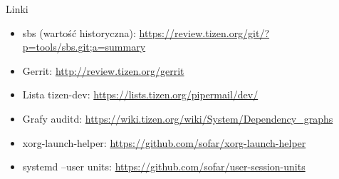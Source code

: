 \documentclass[presentation,aspectratio=43,12pt]{beamer}
\begin{document}
\begin{frame}[label=sec-7-3]{Linki}
\begin{itemize}
\item sbs (wartość historyczna): \url{https://review.tizen.org/git/?p=tools/sbs.git;a=summary}

\item Gerrit:  \url{http://review.tizen.org/gerrit}

\item Lista tizen-dev: \url{https://lists.tizen.org/pipermail/dev/}

\item Grafy auditd: \url{https://wiki.tizen.org/wiki/System/Dependency_graphs}

\item xorg-launch-helper: \url{https://github.com/sofar/xorg-launch-helper}

\item systemd --user units: \url{https://github.com/sofar/user-session-units}
\end{itemize}
\end{frame}
\end{document}
